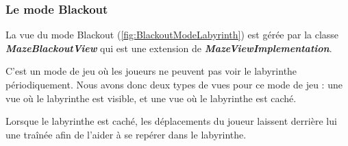 \subsubsection*{Le mode Blackout}

La vue du mode Blackout (\ref{fig:BlackoutModeLabyrinth}) est gérée par la classe \textbf{\textit{MazeBlackoutView}} qui est une extension de \textbf{\textit{MazeViewImplementation}}.

C'est un mode de jeu où les joueurs ne peuvent pas voir le labyrinthe périodiquement. Nous avons donc deux types de vues pour ce mode de jeu : une vue où le labyrinthe est visible, et une vue où le labyrinthe est caché.

Lorsque le labyrinthe est caché, les déplacements du joueur laissent derrière lui une traînée afin de l'aider à se repérer dans le labyrinthe.

